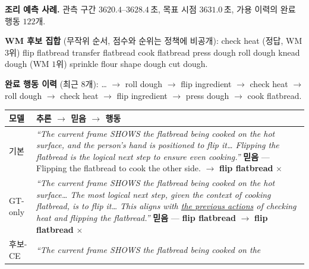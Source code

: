 \documentclass[letterpaper]{article}
\newcommand{\obs}[1]{\textcolor{measuredblue}{#1}}
\newcommand{\scmark}[1]{\MakeUppercase{#1}}
\begin{document}
\begin{table}[t]
\footnotesize
\setlength{\parindent}{0pt}
\textbf{조리 예측 사례.} 관측 구간
\obs{$3620.4$--$3628.4$}\,초, 목표 시점 \obs{$3631.0$}\,초,
가용 이력의 완료 행동 \obs{$122$}개.\par
\smallskip
\textbf{WM 후보 집합} (무작위 순서, 점수와 순위는 정책에 비공개):
check heat (정답, WM \obs{$3$}위) \textperiodcentered{} flip flatbread
\textperiodcentered{} transfer flatbread \textperiodcentered{} cook flatbread
\textperiodcentered{} press dough \textperiodcentered{} roll dough
\textperiodcentered{} knead dough (WM \obs{$1$}위) \textperiodcentered{}
sprinkle flour \textperiodcentered{} shape dough \textperiodcentered{} cut
dough.\par
\smallskip
\textbf{완료 행동 이력} (최근 \obs{$8$}개): \ldots{} $\rightarrow$ roll
dough $\rightarrow$ flip ingredient $\rightarrow$ check heat $\rightarrow$ roll
dough $\rightarrow$ check heat $\rightarrow$ flip ingredient $\rightarrow$ press
dough $\rightarrow$ cook flatbread.\par
\medskip
\setlength{\tabcolsep}{6pt}
\begin{tabular}{@{}p{}p{}@{}}
\toprule
모델 & 추론 $\rightarrow$ 믿음 $\rightarrow$ 행동 \\
\midrule
기본
  & \emph{``The current frame \scmark{shows} the flatbread being cooked on the
    hot surface, and the person's hand is positioned to flip it\ldots{}
    Flipping the flatbread is the logical next step to ensure even cooking.''}
    \newline
    \textbf{믿음} --- Flipping the flatbread to cook the other side.
    \newline
    $\rightarrow$ \textbf{flip flatbread} $\times$
    \quad{\scriptsize[``shows''를 통한 장면 묘사]} \\
GT-only
  & \emph{``The current frame \scmark{shows} the flatbread being cooked on the
    hot surface\ldots{} The most logical next step, given the context of
    cooking flatbread, is to flip it\ldots{} This aligns with
    \underline{the previous actions} of checking heat and flipping the
    flatbread.''}
    \newline
    \textbf{믿음} --- \textbf{flip flatbread}
    \quad{\scriptsize[행동을 복사한 믿음]}
    \newline
    $\rightarrow$ \textbf{flip flatbread} $\times$
    \quad{\scriptsize[``shows''를 통한 장면 묘사]} \\
후보-CE
  & \emph{``The current frame \scmark{shows} the flatbread being cooked on the
}
\end{tabular}
\end{table}
\end{document}
